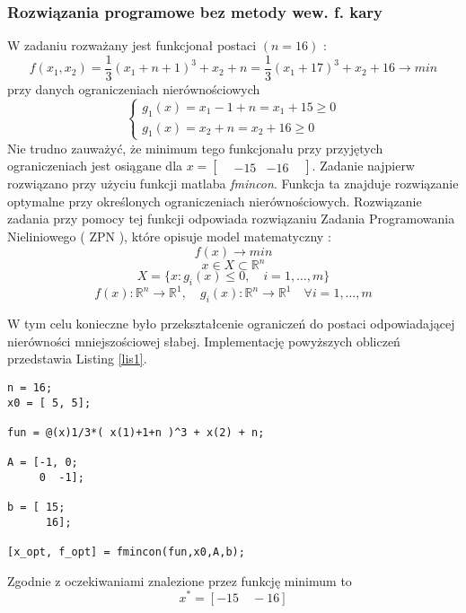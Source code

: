\documentclass[a4paper,15pt]{article}
\begin{document}
\subsubsection{Rozwiązania programowe bez metody wew. f. kary}
W zadaniu rozważany jest funkcjonał postaci \( ( n = 16 ) \) :
\begin{equation*}
f(x_{1},x_{2})=\frac{1}{3}(x_{1}+n+1)^{3}+x_{2}+n = \frac{1}{3}(x_{1}+17)^{3}+x_{2}+16 \rightarrow min
\end{equation*}  
przy danych ograniczeniach nierównościowych
\begin{equation*}
\begin{cases}
g_{1}(x) = x_{1}-1+n = x_{1} + 15 \geq 0 \\
g_{1}(x) = x_{2}+n = x_{2} + 16 \geq 0
\end{cases}
\end{equation*}
Nie trudno zauważyć, że minimum tego funkcjonału przy przyjętych ograniczeniach jest osiągane dla 
\( x = \begin{bmatrix}
& -15 & -16 &
\end{bmatrix} \). 
Zadanie najpierw rozwiązano przy użyciu funkcji matlaba \textit{fmincon}. Funkcja ta znajduje rozwiązanie optymalne przy określonych ograniczeniach nierównościowych. Rozwiązanie zadania przy pomocy tej funkcji odpowiada rozwiązaniu Zadania Programowania Nieliniowego ( ZPN ), które opisuje model matematyczny :
\begin{equation*}
f(x) \rightarrow min
\end{equation*}
\begin{equation*}
x \in X \subset \mathbb{R}^{n}
\end{equation*} 
\begin{equation*}
X = \{ x: g_{i}(x) \leq 0 , \quad i = 1, \dotsc ,m \}
\end{equation*} 
\begin{equation*}
f(x): \mathbb{R}^{n} \rightarrow \mathbb{R}^{1}, \quad g_{i}(x): \mathbb{R}^{n} \rightarrow \mathbb{R}^{1} \quad \forall i = 1, \dotsc ,m
\end{equation*}

W tym celu konieczne było przekształcenie ograniczeń do postaci odpowiadającej nierówności mniejszościowej słabej. \vspace{7pt}
Implementację powyższych obliczeń przedstawia Listing \ref{lis1}.

\begin{lstlisting}[caption=Znalezienie minimum z ograniczeniami ( fmincon ), captionpos=b,label=lis1, firstnumber=12,frame=single]
% znalezienie minimum z ograniczeniami
n = 16;
x0 = [ 5, 5]; 

fun = @(x)1/3*( x(1)+1+n )^3 + x(2) + n;

A = [-1, 0;
     0  -1];
 
b = [ 15;
      16];

[x_opt, f_opt] = fmincon(fun,x0,A,b);

\end{lstlisting}
Zgodnie z oczekiwaniami znalezione przez funkcję minimum to \\
\begin{equation}
x^{*} = [ -15 \quad -16 ] 
\end{equation}
\end{document}
